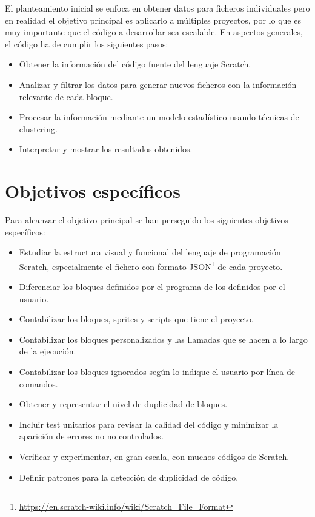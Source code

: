 \documentclass[a4paper, 12pt]{book}
\begin{document}
El planteamiento inicial se enfoca en obtener datos para ficheros individuales pero en realidad el objetivo principal es aplicarlo a múltiples proyectos, por lo que es muy importante que el código a desarrollar sea escalable. En aspectos generales, el código ha de cumplir los siguientes pasos:

\begin{itemize}
  \item Obtener la información del código fuente del lenguaje Scratch.
  \item Analizar y filtrar los datos para generar nuevos ficheros con la información relevante de cada bloque.
  \item Procesar la información mediante un modelo estadístico usando técnicas de clustering.
  \item Interpretar y mostrar los resultados obtenidos.
\end{itemize}


\section{Objetivos específicos}
\label{sec:objetivos-especificos}

Para alcanzar el objetivo principal se han perseguido los siguientes objetivos específicos:


\begin{itemize}
  	\item Estudiar la estructura visual y funcional del lenguaje de programación Scratch, especialmente el fichero con formato JSON\footnote{\url{https://en.scratch-wiki.info/wiki/Scratch_File_Format}} de cada proyecto.
  	\item Diferenciar los bloques definidos por el programa de los definidos por el usuario.
  	\item Contabilizar los bloques, sprites y scripts que tiene el proyecto.
  	\item Contabilizar los bloques personalizados y las llamadas que se hacen a lo largo de la ejecución.
  	\item Contabilizar los bloques ignorados según lo indique el usuario por línea de comandos.
  	\item Obtener y representar el nivel de duplicidad de bloques. 	
 	\item Incluir test unitarios para revisar la calidad del código y minimizar la aparición de errores no no controlados.  	
	\item Verificar y experimentar, en gran escala, con muchos códigos de Scratch.
	\item Definir patrones para la detección de duplicidad de código.
\end{itemize}
\end{document}
